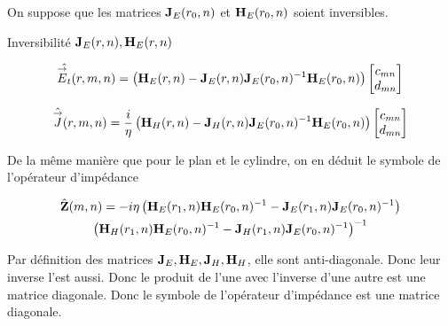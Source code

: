         On suppose que les matrices \(\mathbf{J}_{E}(r_0,n)\) et \(\mathbf{H}_{E}(r_0,n)\) soient inversibles.

        \begin{TODO}
          Inversibilité \(\mathbf{J}_{E}(r,n), \mathbf{H}_{E}(r,n)\)
        \end{TODO}

        \begin{equation}
            \hat{{\overset{\rightarrow}{E}}_t}(r,m,n) = 
            \left(
                \mathbf{H}_{E}(r,n)
                -
                \mathbf{J}_{E}(r,n)
                \mathbf{J}_{E}(r_0,n)^{-1}
                \mathbf{H}_{E}(r_0,n)
            \right)
            \begin{bmatrix}
                c_{mn}
                \\
                d_{mn}
            \end{bmatrix}
        \end{equation}


        \begin{equation}
            \hat{{\overset{\rightarrow}{J}}}(r,m,n) = \dfrac{i}{\eta}
            \left(
                \mathbf{H}_{H}(r,n)
                -
                \mathbf{J}_{H}(r,n)
                \mathbf{J}_{E}(r_0,n)^{-1}
                \mathbf{H}_{E}(r_0,n)
            \right)
            \begin{bmatrix}
                c_{mn}
                \\
                d_{mn}
            \end{bmatrix}
        \end{equation}

        De la même manière que pour le plan et le cylindre, on en déduit le symbole de l'opérateur d'impédance

        \begin{multline}
            \hat{\mathbf{Z}}(m,n) = -i\eta
            \left(
                \mathbf{H}_{E}(r_1,n)
                \mathbf{H}_{E}(r_0,n)^{-1}
                -
                \mathbf{J}_{E}(r_1,n)
                \mathbf{J}_{E}(r_0,n)^{-1}
            \right)
            \\
            \left(
                \mathbf{H}_{H}(r_1,n)
                \mathbf{H}_{E}(r_0,n)^{-1}
                -
                \mathbf{J}_{H}(r_1,n)
                \mathbf{J}_{E}(r_0,n)^{-1}
            \right)^{-1}
        \end{multline}

        Par définition des matrices \(\mathbf{J}_E,\mathbf{H}_E,\mathbf{J}_H,\mathbf{H}_H\), elle sont anti-diagonale. Donc leur inverse l'est aussi. Donc le produit de l'une avec l'inverse d'une autre est une matrice diagonale. Donc le symbole de l'opérateur d'impédance est une matrice diagonale.

